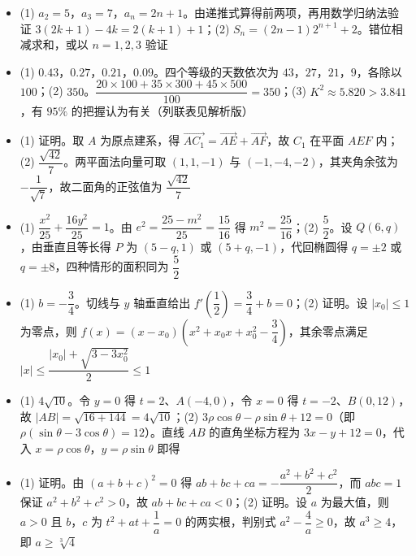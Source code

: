 \begin{itemize}[leftmargin=2.6em]
  \item[\textbf{17.}] (1) $a_2=5$，$a_3=7$，$a_n=2n+1$。由递推式算得前两项，再用数学归纳法验证 $3(2k+1)-4k=2(k+1)+1$；(2) $S_n=(2n-1)2^{n+1}+2$。错位相减求和，或以 $n=1,2,3$ 验证
  \item[\textbf{18.}] (1) $0.43$，$0.27$，$0.21$，$0.09$。四个等级的天数依次为 $43$，$27$，$21$，$9$，各除以 $100$；(2) $350$。$\dfrac{20\times100+35\times300+45\times500}{100}=350$；(3) $K^2\approx5.820>3.841$，有 $95\%$ 的把握认为有关（列联表见解析版）
  \item[\textbf{19.}] (1) 证明。取 $A$ 为原点建系，得 $\overrightarrow{AC_1}=\overrightarrow{AE}+\overrightarrow{AF}$，故 $C_1$ 在平面 $AEF$ 内；(2) $\dfrac{\sqrt{42}}7$。两平面法向量可取 $(1,1,-1)$ 与 $(-1,-4,-2)$，其夹角余弦为 $-\dfrac1{\sqrt7}$，故二面角的正弦值为 $\dfrac{\sqrt{42}}7$
  \item[\textbf{20.}] (1) $\dfrac{x^2}{25}+\dfrac{16y^2}{25}=1$。由 $e^2=\dfrac{25-m^2}{25}=\dfrac{15}{16}$ 得 $m^2=\dfrac{25}{16}$；(2) $\dfrac52$。设 $Q(6,q)$，由垂直且等长得 $P$ 为 $(5-q,1)$ 或 $(5+q,-1)$，代回椭圆得 $q=\pm2$ 或 $q=\pm8$，四种情形的面积同为 $\dfrac52$
  \item[\textbf{21.}] (1) $b=-\dfrac34$。切线与 $y$ 轴垂直给出 $f'\left(\dfrac12\right)=\dfrac34+b=0$；(2) 证明。设 $|x_0|\leqslant1$ 为零点，则 $f(x)=(x-x_0)\left(x^2+x_0x+x_0^2-\dfrac34\right)$，其余零点满足 $\left|x\right|\leqslant\dfrac{|x_0|+\sqrt{3-3x_0^2}}2\leqslant1$
\end{itemize}

\begin{itemize}[leftmargin=2.6em]
  \item[\textbf{22.}] (1) $4\sqrt{10}$。令 $y=0$ 得 $t=2$、$A(-4,0)$，令 $x=0$ 得 $t=-2$、$B(0,12)$，故 $|AB|=\sqrt{16+144}=4\sqrt{10}$；(2) $3\rho\cos\theta-\rho\sin\theta+12=0$（即 $\rho(\sin\theta-3\cos\theta)=12$）。直线 $AB$ 的直角坐标方程为 $3x-y+12=0$，代入 $x=\rho\cos\theta$，$y=\rho\sin\theta$ 即得
  \item[\textbf{23.}] (1) 证明。由 $(a+b+c)^2=0$ 得 $ab+bc+ca=-\dfrac{a^2+b^2+c^2}2$，而 $abc=1$ 保证 $a^2+b^2+c^2>0$，故 $ab+bc+ca<0$；(2) 证明。设 $a$ 为最大值，则 $a>0$ 且 $b$，$c$ 为 $t^2+at+\dfrac1a=0$ 的两实根，判别式 $a^2-\dfrac4a\geqslant0$，故 $a^3\geqslant4$，即 $a\geqslant\sqrt[3]{4}$
\end{itemize}
